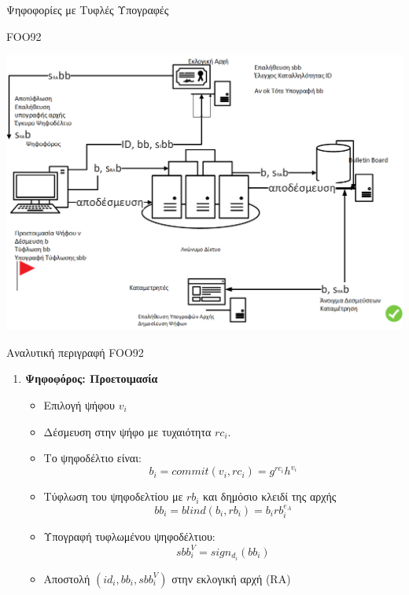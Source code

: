 \documentclass[handout]{beamer}
\begin{document}
\begin{section}{Ψηφοφορίες με Τυφλές Υπογραφές}
\begin{frame}{FOO92}
    \begin{center}
        \includegraphics[scale=0.35]{foo.PNG}
    \end{center}
\end{frame}

\begin{frame}[allowframebreaks]{Αναλυτική περιγραφή FOO92}

\begin{enumerate}
\item \textbf{Ψηφοφόρος: Προετοιμασία}
\begin{itemize}
\item Επιλογή ψήφου $v_i$
\item Δέσμευση στην ψήφο με τυχαιότητα $rc_i$. 
\item Το ψηφοδέλτιο είναι: $$b_i = commit(v_i, rc_i) = g^{rc_i} h^{v_i}$$
\item Τύφλωση του ψηφοδελτίου με $rb_i$ και δημόσιο κλειδί της αρχής  $$ bb_i = blind(b_i,rb_i) = b_i rb_{i}^{e_A} $$
\item Υπογραφή τυφλωμένου ψηφοδέλτιου: $$sbb_i^V = sign_{d_i}(bb_i)$$
\item Αποστολή $(id_i,bb_i,sbb_i^V)$ στην εκλογική αρχή (RA)
\end{itemize}

\framebreak


\end{enumerate}
\end{frame}
\end{section}
\end{document}
